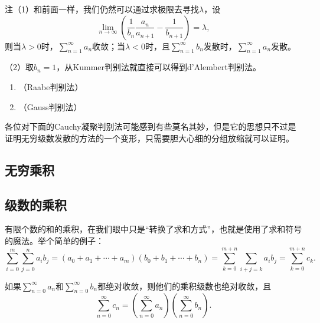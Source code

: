     {\heiti 注}（1）和前面一样，我们仍然可以通过求极限去寻找\(\lambda\)，设\[\lim\limits_{n\to\infty}\left(\frac{1}{b_n}\frac{a_n}{a_{n+1}}-\frac{1}{b_{n+1}}\right)=\lambda,\]则当\(\lambda>0\)时，\(\displaystyle\sum_{n=1}^{\infty}a_n\)收敛；当\(\lambda<0\)时，且\(\displaystyle\sum_{n=1}^{\infty}b_n\)发散时，\(\displaystyle\sum_{n=1}^{\infty}a_n\)发散。

    （2）取\(b_n=1\)，从Kummer判别法就直接可以得到d'Alembert判别法。
    \begin{corollary}
        \begin{enumerate}
            \item （Raabe判别法）
            \item （Gauss判别法）
        \end{enumerate}
    \end{corollary}

    各位对下面的Cauchy凝聚判别法可能感到有些莫名其妙，但是它的思想只不过是证明无穷级数发散的方法的一个变形，只需要胆大心细的分组放缩就可以证明。
    \begin{theorem}[Cauchy凝聚判别法]
        
    \end{theorem}
    \subsection{无穷乘积}
    \begin{definition}[无穷乘积]\label{def:数项级数:无穷乘积}
        
    \end{definition}

    \subsection{级数的乘积}
    有限个数的和的乘积，在我们眼中只是“转换了求和方式”，也就是使用了求和符号的魔法。举个简单的例子：\[\sum_{i=0}^{m}\sum_{j=0}^{n}a_ib_j=(a_0+a_1+\cdots+a_m)(b_0+b_1+\cdots+b_n)=\sum_{k=0}^{m+n}\sum_{i+j=k}a_ib_j=\sum_{k=0}^{m+n}c_k.\]
    \begin{definition}[Cauchy乘积]
        
    \end{definition}
    \begin{theorem}[Cauchy]\label{thm:数项级数:Cauchy定理}
        如果\(\sum\limits_{n=0}^{\infty}a_n\)和\(\sum\limits_{n=0}^{\infty}b_n\)都绝对收敛，则他们的乘积级数也绝对收敛，且\[\sum_{n=0}^{\infty}c_n=\left(\sum_{n=0}^{\infty}a_n\right)\left(\sum_{n=0}^{\infty}b_n\right).\]
    \end{theorem}

